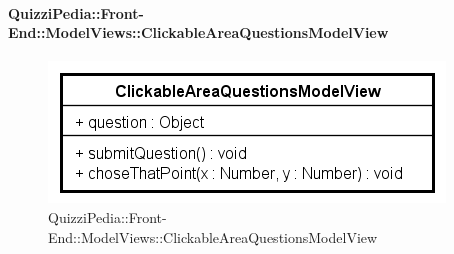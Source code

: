 \paragraph[QuizziPedia::Front-End::ModelViews\\::ClickableAreaQuestionsModelView]{QuizziPedia::Front-End::ModelViews::ClickableAreaQuestionsModelView}
\begin{figure} [ht]
	\centering
	\includegraphics[scale=0.80]{UML/Classi/Front-End/QuizziPedia_Front-end_ModelView_ClickableAreaQuestionsModelView.png}
	\caption{QuizziPedia::Front-End::ModelViews::ClickableAreaQuestionsModelView}
\end{figure} \FloatBarrier
